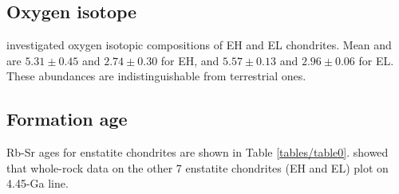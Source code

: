 \documentclass[12pt]{article}
\begin{document}
\subsection{Oxygen isotope}
\cite{Clayton:1984} investigated oxygen isotopic compositions of EH
and EL chondrites. Mean  and  are
$5.31\pm0.45$ and $2.74\pm0.30$ for EH, and $5.57\pm0.13$ and
$2.96\pm0.06$ for EL. These abundances are indistinguishable from
terrestrial ones.

\subsection{Formation age}
Rb-Sr ages for enstatite chondrites are shown in Table
\ref{tables/table0}. \cite{Gopalan:1970} showed that whole-rock data
on the other 7 enstatite chondrites (EH and EL) plot on 4.45-Ga line.



\clearpage

\listoffigures
\listoftables
\end{document}
